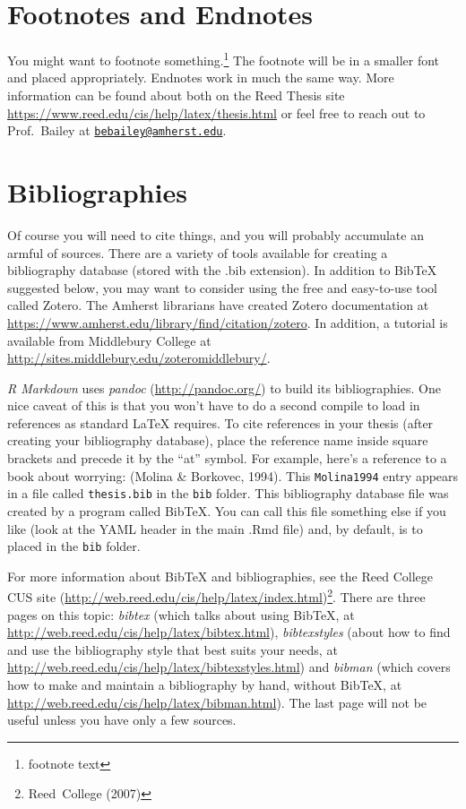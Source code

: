 \documentclass[12pt, twoside]{amherstthesis}
\begin{document}
\hypertarget{footnotes-and-endnotes}{%
\section{Footnotes and Endnotes}\label{footnotes-and-endnotes}}

You might want to footnote something.\footnote{footnote text} The footnote will be in a smaller font and placed appropriately. Endnotes work in much the same way. More information can be found about both on the Reed Thesis site \url{https://www.reed.edu/cis/help/latex/thesis.html} or feel free to reach out to Prof.~Bailey at \href{mailto:bebailey@amherst.edu}{\nolinkurl{bebailey@amherst.edu}}.

\hypertarget{bibliographies}{%
\section{Bibliographies}\label{bibliographies}}

Of course you will need to cite things, and you will probably accumulate an armful of sources. There are a variety of tools available for creating a bibliography database (stored with the .bib extension). In addition to BibTeX suggested below, you may want to consider using the free and easy-to-use tool called Zotero. The Amherst librarians have created Zotero documentation at \url{https://www.amherst.edu/library/find/citation/zotero}. In addition, a tutorial is available from Middlebury College at \url{http://sites.middlebury.edu/zoteromiddlebury/}.

\emph{R Markdown} uses \emph{pandoc} (\url{http://pandoc.org/}) to build its bibliographies. One nice caveat of this is that you won't have to do a second compile to load in references as standard LaTeX requires. To cite references in your thesis (after creating your bibliography database), place the reference name inside square brackets and precede it by the ``at'' symbol. For example, here's a reference to a book about worrying: (Molina \& Borkovec, 1994). This \texttt{Molina1994} entry appears in a file called \texttt{thesis.bib} in the \texttt{bib} folder. This bibliography database file was created by a program called BibTeX. You can call this file something else if you like (look at the YAML header in the main .Rmd file) and, by default, is to placed in the \texttt{bib} folder.

For more information about BibTeX and bibliographies, see the Reed College CUS site (\url{http://web.reed.edu/cis/help/latex/index.html})\footnote{Reed~College (2007)}. There are three pages on this topic: \emph{bibtex} (which talks about using BibTeX, at \url{http://web.reed.edu/cis/help/latex/bibtex.html}), \emph{bibtexstyles} (about how to find and use the bibliography style that best suits your needs, at \url{http://web.reed.edu/cis/help/latex/bibtexstyles.html}) and \emph{bibman} (which covers how to make and maintain a bibliography by hand, without BibTeX, at \url{http://web.reed.edu/cis/help/latex/bibman.html}). The last page will not be useful unless you have only a few sources.
\end{document}
